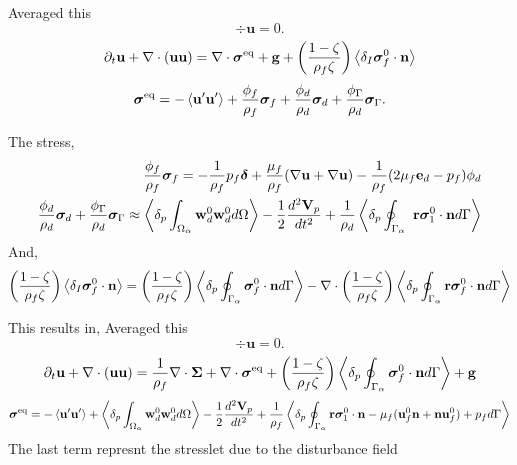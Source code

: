 \documentclass[12pt]{My_preprint}
\begin{document}
Averaged this 
\begin{equation}
    \div\textbf{u}=0.
\end{equation}
\begin{equation}
    \partial_t \textbf{u}  
    + \mathbf{\nabla}\cdot (
    \textbf{u}\textbf{u}
    )
    = 
    \mathbf{\nabla}\cdot \bm{\sigma}^\text{eq} + 
    \textbf{g} 
    + \left(\frac{1-\zeta}{\rho_f\zeta}\right) \left<\delta_I \bm{\sigma}_f^0 \cdot \textbf{n}\right> 
\end{equation}
\begin{equation}
    \bm\sigma^\text{eq} = 
    - \left< \textbf{u}'\textbf{u}'\right>
    + \frac{\phi_f}{\rho_f}\bm\sigma_f
    + \frac{\phi_d}{\rho_d}\bm\sigma_d
    + \frac{\phi_\Gamma}{\rho_d} \bm\sigma_\Gamma. 
\end{equation}

The stress, 
\begin{align}
    \frac{\phi_f}{\rho_f}\bm\sigma_f
    = 
    - \frac{1}{\rho_f} p_f \bm\delta 
    + \frac{\mu_f}{\rho_f}(\mathbf{\nabla} \textbf{u} + \mathbf{\nabla} \textbf{u})
    - \frac{1}{\rho_f} (2\mu_f \textbf{e}_d - p_f )\phi_d\\
    \frac{\phi_d}{\rho_d}\bm\sigma_d
    + \frac{\phi_\Gamma}{\rho_d} \bm\sigma_\Gamma \approx
    \left<\delta_p \int_{\Omega_{\alpha}}  
    \textbf{w}_d^0\textbf{w}_d^0  
     d\Omega\right>
    -\frac{1}{2}\frac{d^2 \textbf{V}_p}{dt^2}
    +\frac{1}{\rho_d}\left<\delta_p \oint_{\Gamma_{\alpha}}  \
        \textbf{r}\bm{\sigma}_1^0 \cdot \textbf{n}
     d\Gamma\right>
\end{align}
And, 
\begin{equation*}
    \left(\frac{1-\zeta}{\rho_f\zeta}\right) \left<\delta_I \bm{\sigma}_f^0 \cdot \textbf{n}\right> 
    = 
    \left(\frac{1-\zeta}{\rho_f\zeta}\right) \left<\delta_p \oint_{\Gamma_{\alpha}} \bm{\sigma}_f^0 \cdot \textbf{n} d\Gamma\right> 
    -\mathbf{\nabla}\cdot \left(\frac{1-\zeta}{\rho_f\zeta}\right) \left<\delta_p \oint_{\Gamma_{\alpha}} \textbf{r}\bm{\sigma}_f^0 \cdot \textbf{n} d\Gamma\right> 
\end{equation*}

This results in, 
Averaged this 
\begin{equation}
    \div\textbf{u}=0.
\end{equation}
\begin{equation}
    \partial_t \textbf{u}  
    + \mathbf{\nabla}\cdot (
    \textbf{u}\textbf{u}
    )
    = 
    \frac{1}{\rho_f}\mathbf{\nabla}\cdot \bm{\Sigma} 
    + \mathbf{\nabla}\cdot \bm{\sigma}^\text{eq} 
    + \left(\frac{1-\zeta}{\rho_f\zeta}\right) \left<\delta_p \oint_{\Gamma_{\alpha}}  \bm{\sigma}_f^0 \cdot \textbf{n} d\Gamma\right> 
    + \textbf{g} 
\end{equation}
\begin{equation}
    \bm\sigma^\text{eq} = 
    - \left< \textbf{u}'\textbf{u}'\right>
    +  \left<\delta_p \int_{\Omega_{\alpha}}  
        \textbf{w}_d^0\textbf{w}_d^0  
         d\Omega\right>
        -\frac{1}{2}\frac{d^2 \textbf{V}_p}{dt^2}
        +\frac{1}{\rho_f}\left<\delta_p \oint_{\Gamma_{\alpha}}  
            \textbf{r}\bm{\sigma}_1^0 \cdot \textbf{n}
            - \mu_f(\textbf{u}_f^0\textbf{n}
            + \textbf{n}\textbf{u}_f^0)
            + p_f
         d\Gamma\right>
\end{equation}
The last term represnt the stresslet due to the disturbance field
\end{document}
